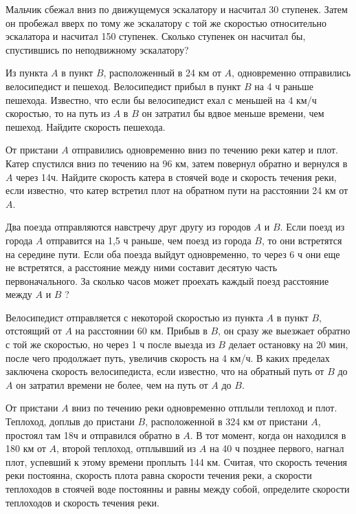 \newpage

\hspace{3mm}

 Мальчик сбежал вниз по движущемуся эскалатору и насчитал 30 ступенек. Затем он пробежал вверх по тому же эскалатору с той же скоростью относительно эскалатора и насчитал 150 ступенек. Сколько ступенек он насчитал бы, спустившись по неподвижному эскалатору?

 Из пункта $A$ в пункт $B$, расположенный в 24 км от $A$, одновременно отправились велосипедист и пешеход. Велосипедист прибыл в пункт $B$ на 4 ч раньше пешехода. Известно, что если бы велосипедист ехал с меньшей на 4 км/ч скоростью, то на путь из $A$ в $B$ он затратил бы вдвое меньше времени, чем пешеход. Найдите скорость пешехода.

 От пристани $A$ отправились одновременно вниз по течению реки катер и плот. Катер спустился вниз по течению на 96 км, затем повернул обратно и вернулся в $A$ через 14ч. Найдите скорость катера в стоячей воде и скорость течения реки, если известно, что катер встретил плот на обратном пути на расстоянии 24 км от $A$.

 Два поезда отправляются навстречу друг другу из городов $A$ и $B$. Если поезд из города $A$ отправится на 1,5 ч раньше, чем поезд из города $B$, то они встретятся на середине пути. Если оба поезда выйдут одновременно, то через 6 ч они еще не встретятся, а расстояние между ними составит десятую часть первоначального. За сколько часов может проехать каждый поезд расстояние между $A$ и $B$ ?

 Велосипедист отправляется с некоторой скоростью из пункта $A$ в пункт $B$, отстоящий от $A$ на расстоянии 60 км. Прибыв в $B$, он сразу же выезжает обратно с той же скоростью, но через 1 ч после выезда из $B$ делает остановку на 20 мин, после чего продолжает путь, увеличив скорость на 4 км/ч. В каких пределах заключена скорость велосипедиста, если известно, что на обратный путь от $B$ до $A$ он затратил времени не более, чем на путь от $A$ до $B$.

 От пристани $A$ вниз по течению реки одновременно отплыли теплоход и плот. Теплоход, доплыв до пристани $B$, расположенной в 324 км от пристани $A$, простоял там 18ч и отправился обратно в $A$. В тот момент, когда он находился в 180 км от $A$, второй теплоход, отплывший из $A$ на 40 ч позднее первого, нагнал плот, успевший к этому времени проплыть 144 км. Считая, что скорость течения реки постоянна, скорость плота равна скорости течения реки, а скорости теплоходов в стоячей воде постоянны и равны между собой, определите скорости теплоходов и скорость течения реки.